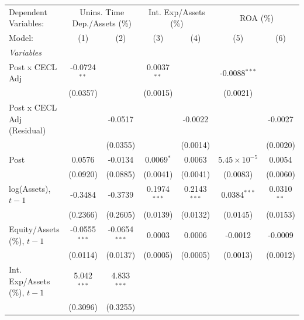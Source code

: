 
\begingroup
\centering
\begin{tabular}{lcccccc}
   \tabularnewline \midrule \midrule
   Dependent Variables: & \multicolumn{2}{c}{Unins. Time Dep./Assets (\%)} & \multicolumn{2}{c}{Int. Exp/Assets (\%)} & \multicolumn{2}{c}{ROA (\%)}\\
   Model:                         & (1)             & (2)             & (3)            & (4)            & (5)                   & (6)\\  
   \midrule
   \emph{Variables}\\
   Post x CECL Adj                & -0.0724$^{**}$  &                 & 0.0037$^{**}$  &                & -0.0088$^{***}$       &   \\   
                                  & (0.0357)        &                 & (0.0015)       &                & (0.0021)              &   \\   
   Post x CECL Adj (Residual)     &                 & -0.0517         &                & -0.0022        &                       & -0.0027\\   
                                  &                 & (0.0355)        &                & (0.0014)       &                       & (0.0020)\\   
   Post                           & 0.0576          & -0.0134         & 0.0069$^{*}$   & 0.0063         & $5.45\times 10^{-5}$  & 0.0054\\   
                                  & (0.0920)        & (0.0885)        & (0.0041)       & (0.0041)       & (0.0083)              & (0.0060)\\   
   log(Assets), $t{-}1$           & -0.3484         & -0.3739         & 0.1974$^{***}$ & 0.2143$^{***}$ & 0.0384$^{***}$        & 0.0310$^{**}$\\   
                                  & (0.2366)        & (0.2605)        & (0.0139)       & (0.0132)       & (0.0145)              & (0.0153)\\   
   Equity/Assets (\%), $t{-}1$    & -0.0555$^{***}$ & -0.0654$^{***}$ & 0.0003         & 0.0006         & -0.0012               & -0.0009\\   
                                  & (0.0114)        & (0.0137)        & (0.0005)       & (0.0005)       & (0.0013)              & (0.0012)\\   
   Int. Exp/Assets (\%), $t{-}1$  & 5.042$^{***}$   & 4.833$^{***}$   &                &                &                       &   \\   
                                  & (0.3096)        & (0.3255)        &                &                &                       &   \\   

\end{tabular}
